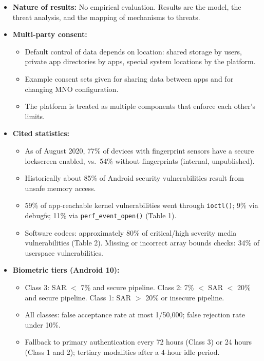 \documentclass[11pt,a4paper]{article}
\begin{document}
\begin{enumerate}
    \begin{itemize}[leftmargin=*,itemsep=1pt,topsep=2pt]
        \item \textbf{Nature of results:} No empirical evaluation. Results are the model, the threat analysis, and the mapping of mechanisms to threats.
        \item \textbf{Multi-party consent:}
        \begin{itemize}[itemsep=0pt]
            \item Default control of data depends on location: shared storage by users, private app directories by apps, special system locations by the platform.
            \item Example consent sets given for sharing data between apps and for changing MNO configuration.
            \item The platform is treated as multiple components that enforce each other's limits.
        \end{itemize}
        \item \textbf{Cited statistics:}
        \begin{itemize}[itemsep=0pt]
            \item As of August 2020, 77\% of devices with fingerprint sensors have a secure lockscreen enabled, vs.\ 54\% without fingerprints (internal, unpublished).
            \item Historically about 85\% of Android security vulnerabilities result from unsafe memory access.
            \item 59\% of app-reachable kernel vulnerabilities went through \texttt{ioctl()}; 9\% via debugfs; 11\% via \texttt{perf\_event\_open()} (Table 1).
            \item Software codecs: approximately 80\% of critical/high severity media vulnerabilities (Table 2). Missing or incorrect array bounds checks: 34\% of userspace vulnerabilities.
        \end{itemize}
        \item \textbf{Biometric tiers (Android 10):}
        \begin{itemize}[itemsep=0pt]
            \item Class 3: SAR $<$ 7\% and secure pipeline. Class 2: 7\% $<$ SAR $<$ 20\% and secure pipeline. Class 1: SAR $>$ 20\% or insecure pipeline.
            \item All classes: false acceptance rate at most 1/50,000; false rejection rate under 10\%.
            \item Fallback to primary authentication every 72 hours (Class 3) or 24 hours (Class 1 and 2); tertiary modalities after a 4-hour idle period.

\end{itemize}
\end{itemize}
\end{enumerate}
\end{document}
